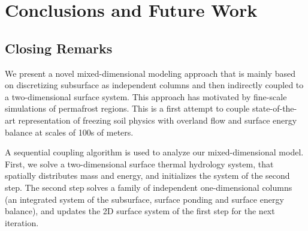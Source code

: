 \documentclass[review]{elsarticle}
\begin{document}
\section{Conclusions and Future Work}\label{conclusion}
\subsection{Closing Remarks}
We present a novel mixed-dimensional modeling approach that is mainly based on discretizing subsurface as independent columns and then indirectly coupled to a two-dimensional surface system. This approach has motivated by fine-scale simulations of permafrost regions. This is a first attempt to couple state-of-the-art representation of freezing soil physics with overland flow and surface energy balance at scales of 100s of meters.
  



A sequential coupling algorithm is used to analyze our mixed-dimensional model. First, we solve a two-dimensional surface thermal hydrology system, that spatially distributes mass and energy, and initializes the system of the second step. The second step solves a family of independent one-dimensional columns (an integrated system of the subsurface, surface ponding and surface energy balance), and updates the 2D surface system of the first step for the next iteration.
\end{document}
